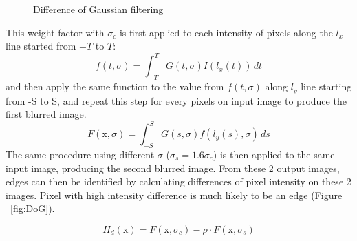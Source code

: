 \begin{figure}[H]
	\centering
	\caption{Difference of Gaussian filtering}\label{fig:image}
\end{figure}

This weight factor with $\sigma_{c}$ is first applied to each intensity of pixels along the $l_{x}$ line started from $-T$ to $T$:
\begin{equation}
	f(t, \sigma)=\int_{-T}^{T}G(t, \sigma)I(l_{x}(t))\,dt
\end{equation}
and then apply the same function to the value from $f(t, \sigma)$ along $l_{y}$ line starting from -S to S, and repeat this step for every pixels on input image to produce the first blurred image.
\begin{equation}
	F(\mbox{x}, \sigma)=
		\int_{-S}^{S}G(s, \sigma)f(l_{y}(s), \sigma)\,ds
\end{equation}
The same procedure using different $\sigma$ ($\sigma_{s} = 1.6\sigma_{c}$) is then applied to the same input image, producing the second blurred image.
From these 2 output images, edges can then be identified by calculating differences of pixel intensity on these 2 images. Pixel with high intensity difference is much likely to be an edge (Figure ~\ref{fig:DoG}).

\begin{equation}
	H_{d}(\mbox{x}) = F(\mbox{x},\sigma_{c}) - \rho\cdot F(\mbox{x},\sigma_{s})
\end{equation}

